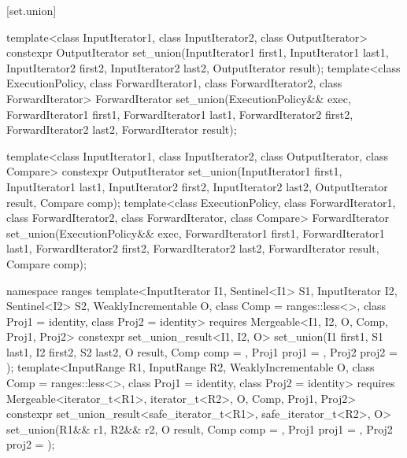 [set.union]{}

%
\begin{itemdecl}
template<class InputIterator1, class InputIterator2,
         class OutputIterator>
  constexpr OutputIterator
    set_union(InputIterator1 first1, InputIterator1 last1,
              InputIterator2 first2, InputIterator2 last2,
              OutputIterator result);
template<class ExecutionPolicy, class ForwardIterator1, class ForwardIterator2,
         class ForwardIterator>
  ForwardIterator
    set_union(ExecutionPolicy&& exec,
              ForwardIterator1 first1, ForwardIterator1 last1,
              ForwardIterator2 first2, ForwardIterator2 last2,
              ForwardIterator result);

template<class InputIterator1, class InputIterator2,
         class OutputIterator, class Compare>
  constexpr OutputIterator
    set_union(InputIterator1 first1, InputIterator1 last1,
              InputIterator2 first2, InputIterator2 last2,
              OutputIterator result, Compare comp);
template<class ExecutionPolicy, class ForwardIterator1, class ForwardIterator2,
         class ForwardIterator, class Compare>
  ForwardIterator
    set_union(ExecutionPolicy&& exec,
              ForwardIterator1 first1, ForwardIterator1 last1,
              ForwardIterator2 first2, ForwardIterator2 last2,
              ForwardIterator result, Compare comp);

namespace ranges {
  template<InputIterator I1, Sentinel<I1> S1, InputIterator I2, Sentinel<I2> S2,
           WeaklyIncrementable O, class Comp = ranges::less<>,
           class Proj1 = identity, class Proj2 = identity>
    requires Mergeable<I1, I2, O, Comp, Proj1, Proj2>
    constexpr set_union_result<I1, I2, O>
      set_union(I1 first1, S1 last1, I2 first2, S2 last2, O result, Comp comp = {},
                Proj1 proj1 = {}, Proj2 proj2 = {});
  template<InputRange R1, InputRange R2, WeaklyIncrementable O,
           class Comp = ranges::less<>, class Proj1 = identity, class Proj2 = identity>
    requires Mergeable<iterator_t<R1>, iterator_t<R2>, O, Comp, Proj1, Proj2>
    constexpr set_union_result<safe_iterator_t<R1>, safe_iterator_t<R2>, O>
      set_union(R1&& r1, R2&& r2, O result, Comp comp = {},
                Proj1 proj1 = {}, Proj2 proj2 = {});
}
\end{itemdecl}


